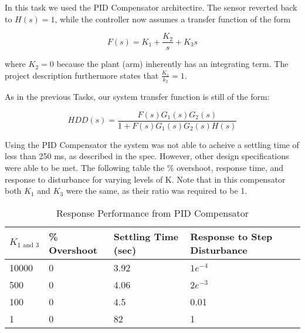 \documentclass{article}
\begin{document}
In this task we used the PID Compensator architectire. The sensor reverted back
to $H(s) = 1$, while the controller now assumes a transfer function of the form

$$ F(s) = K_1 + \frac{K_2}{s}  + K_3s $$

where $K_2 = 0$ because the plant (arm) inherently has an integrating term. The
project description furthermore states that $\frac{K_1}{k_2} = 1$.

As in the previous Tasks, our system transfer function is still of the form:

$$HDD(s) = \frac{F(s)G_1(s)G_2(s)}{1 + F(s)G_1(s)G_2(s)H(s)}$$

Using the PID Compensator the system was not able to acheive a settling time
of less than 250 ms, as described in the spec. However, other design
specifications were able to be met. The following table the \% overshoot,
response time, and response to disturbance for varying levels of K. Note that
in this compensator both $K_1$ and $K_3$ were the same, as their ratio was
required to be 1.

\begin{table}[H]
  \begin{center}
    \begin{tabular}{ | l | l | l | p{5cm} |}
    \hline
    \textbf{$K_{1\text{ and }3}$} & \textbf{\% Overshoot} & 
	\textbf{Settling Time (sec)}  & \textbf{Response to Step Disturbance}\\ \hline
    10000 & 0 & 3.92 & $1e^{-4}$\\ \hline 
    500 & 0 & 4.06 & $2e^{-3}$ \\ \hline
    100 & 0 & 4.5 & 0.01 \\ \hline
    1 & 0 & 82 & 1 \\ \hline
   \end{tabular}
 \end{center}
 \caption{Response Performance from PID Compensator}
\end{table}

\end{document}
